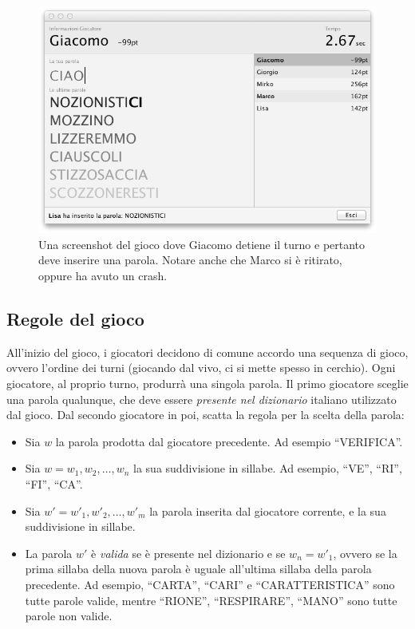 \documentclass[10.5pt]{article}
\begin{document}
\begin{figure}
	\begin{center}
		\includegraphics[scale=0.5]{imgs/screenshot.png}
		\caption{Una screenshot del gioco dove Giacomo detiene il turno e pertanto deve inserire una parola. Notare anche che Marco si è ritirato, oppure ha avuto un crash.}
	\end{center}
\end{figure}


\subsection{Regole del gioco}
All'inizio del gioco, i giocatori decidono di comune accordo una sequenza di gioco, ovvero l'ordine dei turni (giocando dal vivo, ci si mette spesso in cerchio). Ogni giocatore, al proprio turno, produrrà una singola parola. Il primo giocatore sceglie una parola qualunque, che deve essere \emph{presente nel dizionario} italiano utilizzato dal gioco. Dal secondo giocatore in poi, scatta la regola per la scelta della parola:

\begin{itemize}
\item Sia $w$ la parola prodotta dal giocatore precedente. Ad esempio ``VERIFICA''.
\item Sia $w=w_1, w_2, \dots, w_n$ la sua suddivisione in sillabe. Ad esempio, ``VE'', ``RI'', ``FI'', ``CA''.
\item Sia $w'=w'_1, w'_2, \dots, w'_m$ la parola inserita dal giocatore corrente, e la sua suddivisione in sillabe.
\item La parola $w'$ è \emph{valida} se è presente nel dizionario e se $w_n = w'_1$, ovvero se la prima sillaba della nuova parola è uguale all'ultima sillaba della parola precedente. Ad esempio, ``CARTA'', ``CARI'' e ``CARATTERISTICA'' sono tutte parole valide, mentre ``RIONE'', ``RESPIRARE'', ``MANO'' sono tutte parole non valide.
\end{itemize}
\end{document}
